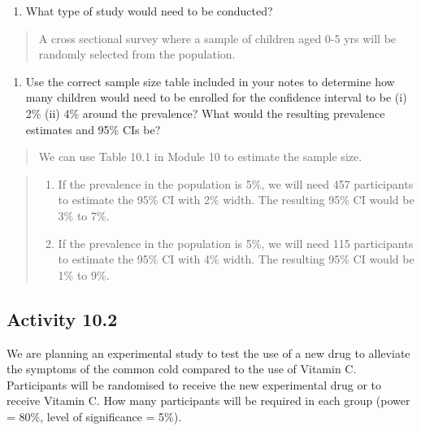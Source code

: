 \documentclass[
]{memoir}
\providecommand{\tightlist}{%
  \setlength{\itemsep}{0pt}\setlength{\parskip}{0pt}}
\begin{document}
\begin{enumerate}
\def\labelenumi{\alph{enumi})}
\tightlist
\item
  What type of study would need to be conducted?
\end{enumerate}

\begin{quote}
A cross sectional survey where a sample of children aged 0-5 yrs will be randomly selected from the population.
\end{quote}

\begin{enumerate}
\def\labelenumi{\alph{enumi})}
\setcounter{enumi}{1}
\tightlist
\item
  Use the correct sample size table included in your notes to determine how many children would need to be enrolled for the confidence interval to be (i) 2\% (ii) 4\% around the prevalence? What would the resulting prevalence estimates and 95\% CIs be?
\end{enumerate}

\begin{quote}
We can use Table 10.1 in Module 10 to estimate the sample size.
\end{quote}

\begin{quote}
\begin{enumerate}
\def\labelenumi{\roman{enumi})}
\tightlist
\item
  If the prevalence in the population is 5\%, we will need 457 participants to estimate the 95\% CI with 2\% width. The resulting 95\% CI would be 3\% to 7\%.
\item
  If the prevalence in the population is 5\%, we will need 115 participants to estimate the 95\% CI with 4\% width. The resulting 95\% CI would be 1\% to 9\%.
\end{enumerate}
\end{quote}

\hypertarget{activity-10.2}{%
\subsection*{Activity 10.2}\label{activity-10.2}}

We are planning an experimental study to test the use of a new drug to alleviate the symptoms of the common cold compared to the use of Vitamin C. Participants will be randomised to receive the new experimental drug or to receive Vitamin C. How many participants will be required in each group (power = 80\%, level of significance = 5\%).
\end{document}
